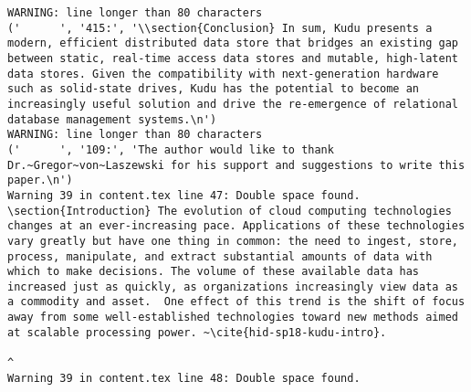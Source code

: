 \begin{tiny}
\begin{verbatim}
WARNING: line longer than 80 characters
('      ', '415:', '\\section{Conclusion} In sum, Kudu presents a modern, efficient distributed data store that bridges an existing gap between static, real-time access data stores and mutable, high-latent data stores. Given the compatibility with next-generation hardware such as solid-state drives, Kudu has the potential to become an increasingly useful solution and drive the re-emergence of relational database management systems.\n')
WARNING: line longer than 80 characters
('      ', '109:', 'The author would like to thank Dr.~Gregor~von~Laszewski for his support and suggestions to write this paper.\n')
Warning 39 in content.tex line 47: Double space found.
\section{Introduction} The evolution of cloud computing technologies changes at an ever-increasing pace. Applications of these technologies vary greatly but have one thing in common: the need to ingest, store, process, manipulate, and extract substantial amounts of data with which to make decisions. The volume of these available data has increased just as quickly, as organizations increasingly view data as a commodity and asset.  One effect of this trend is the shift of focus away from some well-established technologies toward new methods aimed at scalable processing power. ~\cite{hid-sp18-kudu-intro}.  
                                                                                                                                                                                                                                                                                                                                                                                                                                                                                                                                                                                                    ^
Warning 39 in content.tex line 48: Double space found.

\end{verbatim}
\end{tiny}
